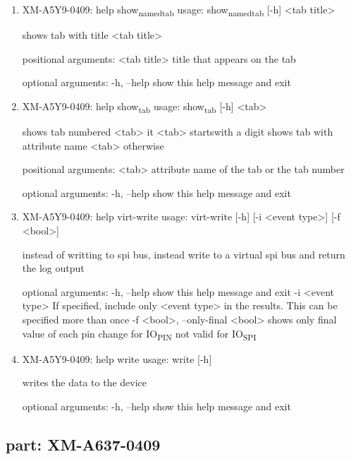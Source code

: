 \documentclass[11pt]{article}
\begin{document}
\begin{enumerate}
\item XM-A5Y9-0409: help show\textsubscript{named}\textsubscript{tab}
\label{sec:org352c4bc}
usage: show\textsubscript{named}\textsubscript{tab} [-h] <tab title>

shows tab with title <tab title>

positional arguments:
  <tab title>  title that appears on the tab

optional arguments:
  -h, --help   show this help message and exit

\item XM-A5Y9-0409: help show\textsubscript{tab}
\label{sec:orge3d5e4c}
usage: show\textsubscript{tab} [-h] <tab>

shows tab numbered <tab> it <tab> startswith a digit shows tab with attribute
name <tab> otherwise

positional arguments:
  <tab>       attribute name of the tab or the tab number

optional arguments:
  -h, --help  show this help message and exit

\item XM-A5Y9-0409: help virt-write
\label{sec:orgc621338}
usage: virt-write [-h] [-i <event type>] [-f <bool>]

instead of writting to spi bus, instead write to a virtual spi bus and return
the log output

optional arguments:
  -h, --help            show this help message and exit
  -i <event type>       If specified, include only <event type> in the
                        results. This can be specified more than once
  -f <bool>, --only-final <bool>
                        shows only final value of each pin change for IO\textsubscript{PIN}
                        not valid for IO\textsubscript{SPI}

\item XM-A5Y9-0409: help write
\label{sec:org65fc76d}
usage: write [-h]

writes the data to the device

optional arguments:
  -h, --help  show this help message and exit
\end{enumerate}

\subsection{part: XM-A637-0409}
\label{sec:org4c4103e}
\end{document}
